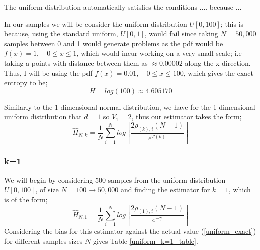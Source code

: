 \documentclass{article}
\begin{document}
The uniform distribution automatically satisfies the conditions .... because ... 

In our samples we will be consider the uniform distribution $U[0,100]$; this is because, using the standard uniform, $U[0,1]$, would fail since taking $N=50,000$ samples between 0 and 1 would generate problems as the pdf would be $f(x) = 1 , \quad 0 \leq x \leq 1$, which would incur working on a very small scale; i.e taking a points with distance between them as $\approx 0.00002$ along the x-direction. Thus, I will be using the pdf $f(x) = 0.01 , \quad 0 \leq x \leq 100$, which gives the exact entropy to be;
\begin{equation} \label{uniform_exact}
H = log(100) \approx 4.605170
\end{equation}

Similarly to the 1-dimensional normal distribution, we have for the 1-dimensional uniform distribution that $d=1$ so $V_{1} = 2$, thus our estimator takes the form;
\begin{equation}
\hat{H}_{N, k} =  \frac{1}{N} \sum_{i=1}^{N} log \left[ \frac{2\rho_{(k),i}(N-1)}{e^{\Psi(k)}} \right]\nonumber
\end{equation}




\subsubsection{k=1} \label{U_k=1}
We will begin by considering 500 samples from the uniform distribution $U[0,100]$, of size $N=100 \to 50,000$ and finding the estimator for $k=1$, which is of the form;
\begin{equation} 
\hat{H}_{N, 1} = \frac{1}{N} \sum_{i=1}^{N} log \left[ \frac{2\rho_{(1),i} (N-1)}{e^{-\gamma}} \right] \nonumber
\end{equation}
Considering the bias for this estimator against the actual value (\ref{uniform_exact}) for different samples sizes $N$ gives Table \ref{uniform_k=1_table}.
\end{document}
